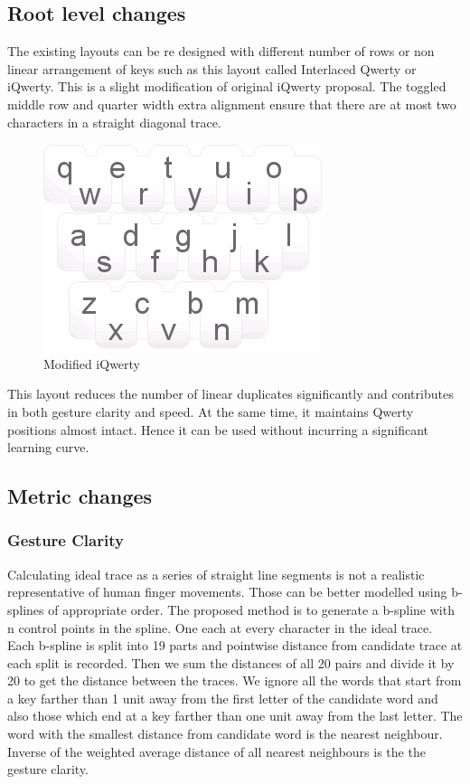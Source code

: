 \documentclass[12pt]{article}
\begin{document}
\subsection{Root level changes}
The existing layouts can be re designed with different number of rows or non linear arrangement of keys such as this layout called Interlaced Qwerty or iQwerty. This is a slight modification of original iQwerty proposal. The toggled middle row and quarter width extra alignment ensure that there are at most two characters in a straight diagonal trace. 
 
\begin{figure}[h!]
	\centering
	\includegraphics[scale=1]{Images/iqmod}
	\caption{Modified iQwerty}
\end{figure}
 
 
This layout reduces the number of linear duplicates significantly and contributes in both gesture clarity and speed. At the same time, it maintains Qwerty positions almost intact. Hence it can be used without incurring a significant learning curve.

\subsection{Metric changes}
\subsubsection{Gesture Clarity}
Calculating ideal trace as a series of straight line segments is not a realistic representative of human finger movements. Those can be better modelled using b-splines of appropriate order.
The proposed method is to generate a b-spline with n control points in the spline. One each at every character in the ideal trace. Each b-spline is split into 19 parts and pointwise distance from candidate trace at each split is recorded. Then we sum the distances of all 20 pairs and divide it by 20 to get the distance between the traces. We ignore all the words that start from a key farther than 1 unit away from the first letter of the candidate word and also those which end at a key farther than one unit away from the last letter. The word with the smallest distance from candidate word is the nearest neighbour. Inverse of the weighted average distance of all nearest neighbours is the the gesture clarity.
\end{document}
